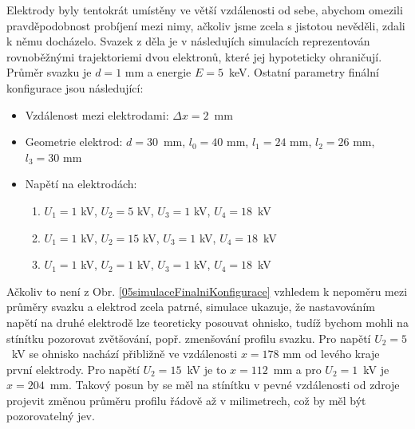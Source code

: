 Elektrody byly tentokrát umístěny ve větší vzdálenosti od sebe, abychom omezili pravděpodobnost probíjení mezi nimy, ačkoliv jsme zcela s jistotou nevěděli, zdali k němu docházelo. Svazek z děla je v následujích simulacích reprezentován rovnoběžnými trajektoriemi dvou elektronů, které jej hypoteticky ohraničují. Průměr svazku je $d = 1$ mm a energie $E = 5$~keV. Ostatní parametry finální konfigurace jsou následující:
\begin{itemize}
	\item Vzdálenost mezi elektrodami: $\Delta x = 2$~mm
	\item Geometrie elektrod: $d = 30$~mm, $l_0 = 40$ mm, $l_1 = 24$ mm, $l_2 = 26$ mm, $l_3 = 30$ mm
	\item Napětí na elektrodách:
	\begin{enumerate}
		\item $U_1 = 1$ kV, $U_2 = 5$ kV, $U_3 = 1$ kV, $U_4 = 18$~kV
		\item $U_1 = 1$ kV, $U_2 = 15$ kV, $U_3 = 1$ kV, $U_4 = 18$~kV
		\item $U_1 = 1$ kV, $U_2 = 1$ kV, $U_3 = 1$ kV, $U_4 = 18$~kV
	\end{enumerate}
\end{itemize}

Ačkoliv to není z Obr. \ref{05simulaceFinalniKonfigurace} vzhledem k nepoměru mezi průměry svazku a elektrod zcela patrné, simulace ukazuje, že nastavováním napětí na druhé elektrodě lze teoreticky posouvat ohnisko, tudíž bychom mohli na stínítku pozorovat zvětšování, popř. zmenšování profilu svazku. Pro napětí $U_2 = 5$~kV se ohnisko nachází přibližně ve vzdálenosti $x = 178$ mm od levého kraje první elektrody. Pro napětí $U_2 = 15$~kV je to $x = 112$~mm a pro $U_2 = 1$~kV je $x = 204$~mm. Takový posun by se měl na stínítku v pevné vzdálenosti od zdroje projevit změnou průměru profilu řádově až v milimetrech, což by měl být pozorovatelný jev.\\

